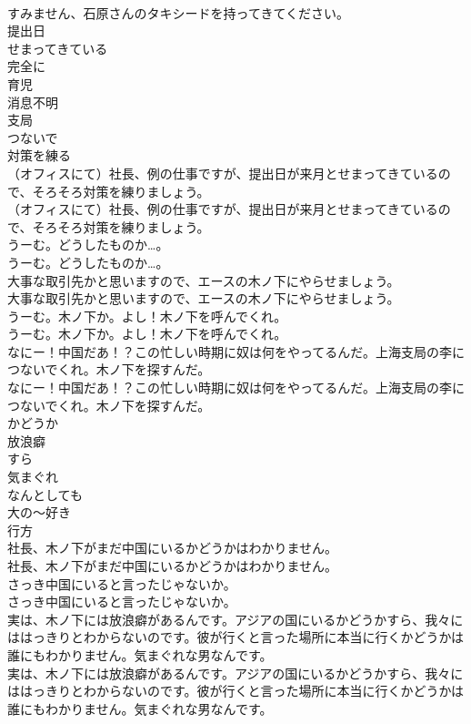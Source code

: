 \documentclass[8pt]{extreport}
\begin{document}
\begin{CJK}{UTF8}{min}
\\	すみません、石原さんのタキシードを持ってきてください。 
\\	提出日
\\	せまってきている
\\	完全に
\\	育児
\\	消息不明
\\	支局
\\	つないで
\\	対策を練る
\\	（オフィスにて）社長、例の仕事ですが、提出日が来月とせまってきているので、そろそろ対策を練りましょう。	
\\	（オフィスにて）社長、例の仕事ですが、提出日が来月とせまってきているので、そろそろ対策を練りましょう。 
\\	うーむ。どうしたものか…。	
\\	うーむ。どうしたものか…。 
\\	大事な取引先かと思いますので、エースの木ノ下にやらせましょう。	
\\	大事な取引先かと思いますので、エースの木ノ下にやらせましょう。 
\\	うーむ。木ノ下か。よし！木ノ下を呼んでくれ。	
\\	うーむ。木ノ下か。よし！木ノ下を呼んでくれ。 
\\	なにー！中国だあ！？この忙しい時期に奴は何をやってるんだ。上海支局の李につないでくれ。木ノ下を探すんだ。	
\\	なにー！中国だあ！？この忙しい時期に奴は何をやってるんだ。上海支局の李につないでくれ。木ノ下を探すんだ。 
\\	かどうか
\\	放浪癖
\\	すら
\\	気まぐれ
\\	なんとしても
\\	大の〜好き
\\	行方
\\	社長、木ノ下がまだ中国にいるかどうかはわかりません。	
\\	社長、木ノ下がまだ中国にいるかどうかはわかりません。 
\\	さっき中国にいると言ったじゃないか。	
\\	さっき中国にいると言ったじゃないか。 
\\	実は、木ノ下には放浪癖があるんです。アジアの国にいるかどうかすら、我々にははっきりとわからないのです。彼が行くと言った場所に本当に行くかどうかは誰にもわかりません。気まぐれな男なんです。	
\\	実は、木ノ下には放浪癖があるんです。アジアの国にいるかどうかすら、我々にははっきりとわからないのです。彼が行くと言った場所に本当に行くかどうかは誰にもわかりません。気まぐれな男なんです。 

\end{CJK}
\end{document}
